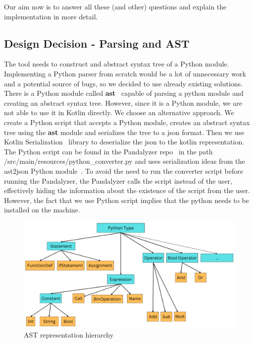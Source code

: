 Our aim now is to answer all these (and other) questions and explain the implementation in more detail.

\subsection{Design Decision - Parsing and AST}

The tool needs to construct and abstract syntax tree of a Python module.
Implementing a Python parser from scratch would be a lot of unnecessary work and a potential source of bugs, so we
decided to use already existing solutions.
There is a Python module called \textbf{ast}~\cite{python-ast} capable of parsing a python module and creating an
abstract syntax tree.
However, since it is a Python module, we are not able to use it in Kotlin directly.
We choose an alternative approach.
We create a Python script that accepts a Python module, creates an abstract syntax tree using the \textbf{ast} module
and serializes the tree to a json format.
Then we use Kotlin Serialization~\cite{kotlin-serialization-guide} library to deserialize the json to the kotlin
representation.
The Python script can be found in the Pandalyzer repo~\cite{pandalyzer} in the path
/src/main/resources/python\_converter.py and uses serialization ideas from the ast2json Python module~\cite{ast2json}.
To avoid the need to run the converter script before running the Pandalyzer, the Pandalyzer calls the script instead of
the user, effectively hiding the information about the existence of the script from the user.
However, the fact that we use Python script implies that the python needs to be installed on the machine.

\begin{figure}[H]
    \caption{AST representation hierarchy}
    \label{fig:python_hierarchy}
    \centering
    \includegraphics[scale=0.5]{img/python_hierarchy}
\end{figure}


